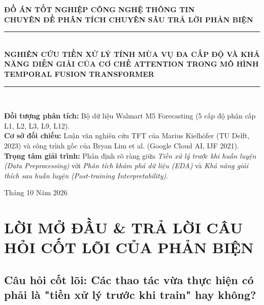 \documentclass[12pt,a4paper,oneside]{article}
\begin{document}
\begin{titlepage}
    \centering
    \vspace*{1cm}
    {\Large \textbf{ĐỒ ÁN TỐT NGHIỆP CÔNG NGHỆ THÔNG TIN}}\\[0.5cm]
    {\large \textbf{CHUYÊN ĐỀ PHÂN TÍCH CHUYÊN SÂU TRẢ LỜI PHẢN BIỆN}}\\[1.5cm]
    
    \rule{\linewidth}{1.5pt}\\[0.4cm]
    {\LARGE \bfseries NGHIÊN CỨU TIỀN XỬ LÝ TÍNH MÙA VỤ ĐA CẤP ĐỘ VÀ KHẢ NĂNG DIỄN GIẢI CỦA CƠ CHẾ ATTENTION TRONG MÔ HÌNH TEMPORAL FUSION TRANSFORMER}\\[0.4cm]
    \rule{\linewidth}{1.5pt}\\[1.5cm]
    
    \begin{minipage}{0.9\textwidth}
        \textbf{Đối tượng phân tích:} Bộ dữ liệu Walmart M5 Forecasting (5 cấp độ phân cấp L1, L2, L3, L9, L12).\\
        \textbf{Cơ sở đối chiếu:} Luận văn nghiên cứu TFT của Marius Kielh\"{o}fer (TU Delft, 2023) và công trình gốc của Bryan Lim et al. (Google Cloud AI, IJF 2021).\\
        \textbf{Trọng tâm giải trình:} Phân định rõ ràng giữa \textit{Tiền xử lý trước khi huấn luyện (Data Preprocessing)} với \textit{Phân tích khám phá dữ liệu (EDA)} và \textit{Khả năng giải thích sau huấn luyện (Post-training Interpretability)}.
    \end{minipage}
    
    \vfill
    {\large Tháng 10 Năm 2026}
\end{titlepage}

\tableofcontents
\newpage

\section{LỜI MỞ ĐẦU \& TRẢ LỜI CÂU HỎI CỐT LÕI CỦA PHẢN BIỆN}
\label{sec:cau_hoi_cot_loi}

\subsection{Câu hỏi cốt lõi: Các thao tác vừa thực hiện có phải là "tiền xử lý trước khi train" hay không?}
\end{document}
